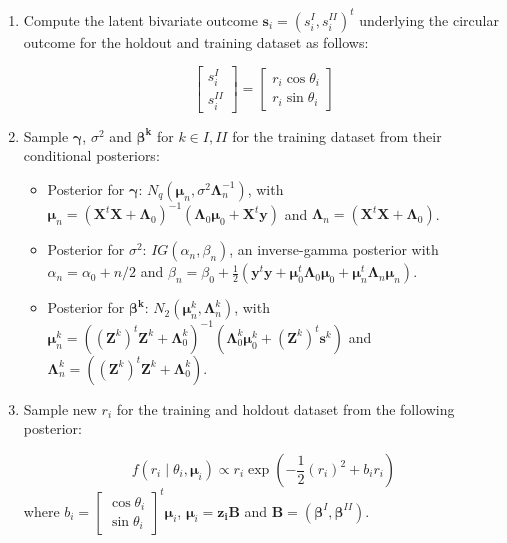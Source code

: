 \documentclass[11pt,]{article}
\begin{document}
\begin{appendices}
\begin{enumerate}
\item Compute the latent bivariate outcome $\boldsymbol{s}_i = (s_i^{I}, s_i^{II})^t$ underlying the circular outcome for the holdout and training dataset as follows:

$$\begin{bmatrix} s^{I}_{i} \\ s^{II}_{i} \end{bmatrix} = \begin{bmatrix} r_i \cos \theta_i \\  r_i\sin \theta_i\end{bmatrix}$$

\item Sample $\boldsymbol{\gamma}$, $\sigma^2$ and $\boldsymbol{\beta^{k}}$ for $k \in I,II$ for the training dataset from their conditional posteriors:

\begin{itemize}
\item Posterior for $\boldsymbol{\gamma}$: $N_q(\boldsymbol{\mu}_n, \sigma^2\boldsymbol{\Lambda}^{-1}_n)$, with $\boldsymbol{\mu}_n = (\boldsymbol{X}^t\boldsymbol{X} + \boldsymbol{\Lambda}_0)^{-1}(\boldsymbol{\Lambda}_0\boldsymbol{\mu}_0 + \boldsymbol{X}^t\boldsymbol{y})$ and $\boldsymbol{\Lambda}_n = (\boldsymbol{X}^t\boldsymbol{X} + \boldsymbol{\Lambda}_0)$.
\item Posterior for $\sigma^2$: $IG(\alpha_{n}, \beta_{n})$, an inverse-gamma posterior with $\alpha_{n} = \alpha_0 + n/2$ and $\beta_{n} = \beta_0 + \frac{1}{2}(\boldsymbol{y}^t\boldsymbol{y} + \boldsymbol{\mu}_{0}^t\boldsymbol{\Lambda}_0\boldsymbol{\mu}_{0} + \boldsymbol{\mu}_{n}^t\boldsymbol{\Lambda}_n\boldsymbol{\mu}_{n})$.
\item Posterior for $\boldsymbol{\beta^{k}}$: $N_2(\boldsymbol{\mu}^k_n, \boldsymbol{\Lambda}^{k}_n)$, with $\boldsymbol{\mu}^k_n = ((\boldsymbol{Z}^k)^t\boldsymbol{Z}^k + \boldsymbol{\Lambda}^k_0)^{-1}(\boldsymbol{\Lambda}^k_0\boldsymbol{\mu}^k_0 + (\boldsymbol{Z}^k)^t\boldsymbol{s}^k)$ and $\boldsymbol{\Lambda}^{k}_n = ((\boldsymbol{Z}^k)^t\boldsymbol{Z}^k + \boldsymbol{\Lambda}^k_0)$.
\end{itemize}

\item Sample new $r_i$ for the training and holdout dataset from the following posterior:

$$f(r_i \mid \theta_i, \boldsymbol{\mu}_i) \propto r_i \exp{(-\frac{1}{2}(r_i)^2 + b_ir_i)}$$ 
where $b_i = \begin{bmatrix} \cos \theta_i \\ \sin \theta_i\end{bmatrix}^t\boldsymbol{\mu}_i$, $\boldsymbol{\mu}_i = \boldsymbol{z_i}\boldsymbol{B}$ and $\boldsymbol{B} = (\boldsymbol{\beta}^{I}, \boldsymbol{\beta}^{II})$. 


\end{enumerate}
\end{appendices}
\end{document}

